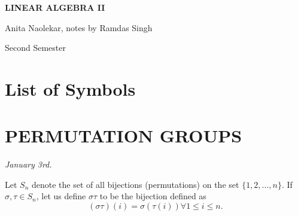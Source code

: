 \documentclass[15pt,a4paper]{book}
\theoremstyle{definition}
\begin{document}
\pagestyle{empty}

\begin{titlepage}
    \begin{center}
    \vspace*{\fill}
    {\Huge \textbf{\MakeUppercase{Linear Algebra II}}\par}

    \vspace{0.5cm} %
    {\Large Anita Naolekar, notes by Ramdas Singh\par}

    \vspace{0.5cm} %
    {\large Second Semester\par}
    \vspace*{\fill}
    \end{center}
\end{titlepage}

\clearpage


\chapter*{List of Symbols}
\begin{notationlist}
    \item
\end{notationlist}

\newpage
\setcounter{tocdepth}{2}
\tableofcontents

\newpage
{}
\pagestyle{fancy}




\chapter{PERMUTATION GROUPS}


\textit{January 3rd.}

Let $S_{n}$ denote the set of all bijections (permutations) on the set $\{1,2,\ldots,n\}$. If $\sigma, \tau \in S_{n}$, let us define $\sigma \tau$ to be the bijection defined as
\begin{equation}
    (\sigma \tau)(i) = \sigma(\tau(i)) \forall 1 \leq i \leq n.
\end{equation}
\end{document}
